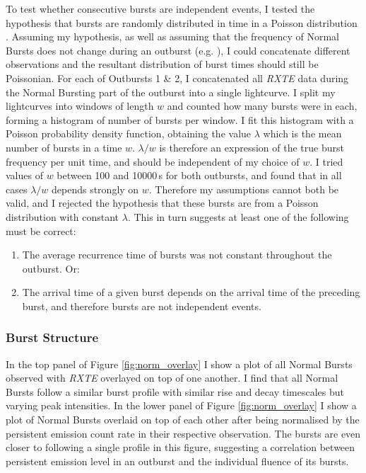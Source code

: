 \par To test whether consecutive bursts are independent events, I tested the hypothesis that bursts are randomly distributed in time in a Poisson distribution \citep{Poisson_Distribution}.  Assuming my hypothesis, as well as assuming that the frequency of Normal Bursts does not change during an outburst (e.g. \citealp{Aptekar_Recur}), I could concatenate different observations and the resultant distribution of burst times should still be Poissonian.  For each of Outbursts 1 \& 2, I concatenated all \textit{RXTE} data during the Normal Bursting part of the outburst into a single lightcurve.  I split my lightcurves into windows of length $w$ and counted how many bursts were in each, forming a histogram of number of bursts per window.  I fit this histogram with a Poisson probability density function, obtaining the value $\lambda$ which is the mean number of bursts in a time $w$.  $\lambda/w$ is therefore an expression of the true burst frequency per unit time, and should be independent of my choice of $w$.  I tried values of $w$ between 100 and 10000\,s for both outbursts, and found that in all cases $\lambda/w$ depends strongly on $w$.  Therefore my assumptions cannot both be valid, and I rejected the hypothesis that these bursts are from a Poisson distribution with constant $\lambda$.  This in turn suggests at least one of the following must be correct:
\begin{enumerate}
\item The average recurrence time of bursts was not constant throughout the outburst.  Or:
\item The arrival time of a given burst depends on the arrival time of the preceding burst, and therefore bursts are not independent events.
\end{enumerate}

\subsubsection{Burst Structure}

\label{sec:struc}

\par In the top panel of Figure \ref{fig:norm_overlay} I show a plot of all Normal Bursts observed with \textit{RXTE} overlayed on top of one another.  I find that all Normal Bursts follow a similar burst profile with similar rise and decay timescales but varying peak intensities.  In the lower panel of Figure \ref{fig:norm_overlay} I show a plot of Normal Bursts overlaid on top of each other after being normalised by the persistent emission count rate in their respective observation.  The bursts are even closer to following a single profile in this figure, suggesting a correlation between persistent emission level in an outburst and the individual fluence of its bursts.

